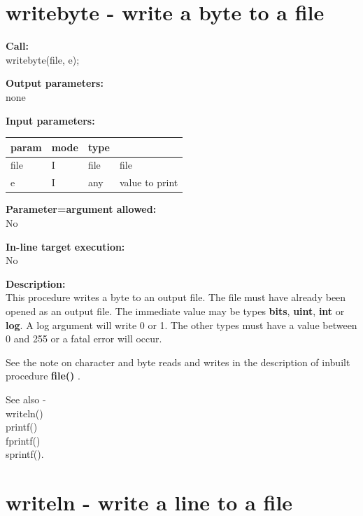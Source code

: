     \section{writebyte - write a byte to a file}\label{sec:ipwritebyte}
        
        {\bf Call:} \\
        writebyte(file, e);
        
        {\bf Output parameters:} \\
        none
        
        {\bf Input parameters:} \\
        \begin{tabular}{| l | l | l | l |}
        \hline
        param  & mode & type  & \\
        \hline \hline
        file & I & file & file              \\ \hline
        e    & I & any  & value to print    \\ \hline
        \end{tabular}
        
        {\bf Parameter=argument allowed:} \\
        No
        
        {\bf In-line target execution:} \\
        No
        
        {\bf Description:} \\
        This procedure writes a byte to an output file. The file
        must have already been opened as an output file. The immediate
        value may be types {\bf bits}, {\bf uint}, {\bf int} or {\bf log}.
        A log argument will write 0 or 1. The other types must have a
        value between 0 and 255 or a fatal error will occur.
        
        See the note on character and byte reads and writes in the description
        of inbuilt procedure {\bf file()} .

        See also - \\
        writeln() \\
        printf() \\
        fprintf() \\
        sprintf().







    \section{writeln - write a line to a file}\label{sec:ipwriteln}
        
